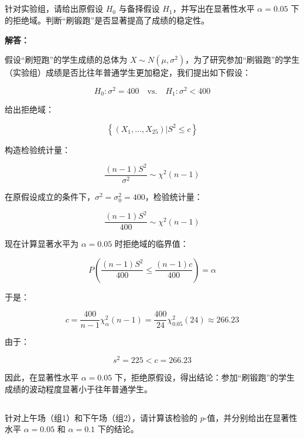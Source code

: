 \documentclass[12pt,a4paper]{article}
\begin{document}
\subsection{}

针对实验组，请给出原假设 $H_0$ 与备择假设 $H_1$，并写出在显著性水平 $\alpha=0.05$ 下的拒绝域。判断“刷锻跑”是否显著提高了成绩的稳定性。

\begin{answerbox}
\textbf{解答：}

假设“刷短跑”的学生成绩的总体为 $X \sim N\left(\mu, \sigma^2\right)$，为了研究参加“刷锻跑”的学生（实验组）成绩是否比往年普通学生更加稳定，我们提出如下假设：

$$
H_0: \sigma^2 = 400 \quad \text{vs.} \quad H_1: \sigma^2 < 400
$$

给出拒绝域：

$$
\left\{(X_1, \ldots, X_{25}) | S^2 \leq c\right\}
$$

构造检验统计量：

$$
\frac{(n-1)S^2}{\sigma^2} \sim \chi^2(n-1)
$$

在原假设成立的条件下，$\sigma^2 = \sigma_0^2 = 400$，检验统计量：

$$
\frac{(n-1)S^2}{400} \sim \chi^2(n-1)
$$

现在计算显著水平为 $\alpha=0.05$ 时拒绝域的临界值：

$$
P\left(\frac{(n-1)S^2}{400} \leq \frac{(n-1)c}{400}\right) = \alpha
$$

于是：

$$
c = \frac{400}{n-1} \chi^2_{\alpha}(n-1) = \frac{400}{24} \chi^2_{0.05}(24) \approx 266.23
$$

由于：

$$
s^2 = 225 < c = 266.23
$$

因此，在显著性水平 $\alpha=0.05$ 下，拒绝原假设，得出结论：参加“刷锻跑”的学生成绩的波动程度显著小于往年普通学生。

\end{answerbox}

\subsection{}

针对上午场（组1）和下午场（组2），请计算该检验的 $p$-值，并分别给出在显著性水平 $\alpha=0.05$ 和 $\alpha=0.1$ 下的结论。
\end{document}
